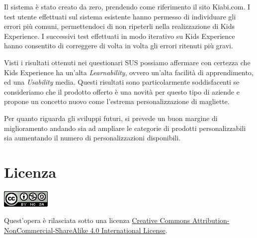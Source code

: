 \documentclass[12pt,italian,]{report}
\begin{document}
Il sistema è stato creato da zero, prendendo come riferimento il sito Kiabi.com. 
I test utente effettuati sul sistema esistente hanno permesso di individuare gli errori più comuni, permettendoci di non ripeterli nella realizzazione di Kids Experience.
I successivi test effettuati in modo iterativo su Kids Experience hanno consentito di correggere di volta in volta gli errori ritenuti più gravi.

Visti i risultati ottenuti nei questionari SUS possiamo affermare con certezza che Kids Experience ha un'alta \emph{Learnability}, ovvero un'alta facilità di apprendimento, ed una \emph{Usability} media. Questi risultati sono particolarmente soddisfacenti se consideriamo che il prodotto offerto è una novità per questo tipo di aziende e propone un concetto nuovo come l'estrema personalizzazione di magliette.

Per quanto riguarda gli sviluppi futuri, si prevede un buon margine di miglioramento andando sia ad ampliare le categorie di prodotti personalizzabili sia aumentando il numero di personalizzazioni disponibili.

\newpage
\section{Licenza}\label{licenza}

\includegraphics{img/licenza.png}

Quest'opera è rilasciata sotto una licenza
\href{https://creativecommons.org/licenses/by-nc-sa/4.0/}{Creative
Commons Attribution-NonCommercial-ShareAlike 4.0 International License}.
\end{document}

